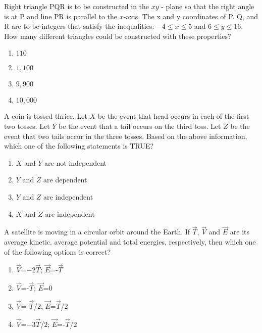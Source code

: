 \begin{center}
\end{center}


    \item Right triangle PQR is to be constructed in the $xy$ - plane so that the right angle is at P and line PR is parallel to the $x$-axis. The x and y coordinates of P. Q, and R are to be integers that satisfy the inequalities: $-4\leq x\leq 5$ and $6\leq y\leq 16$. How many different triangles could be constructed with these properties?
    \begin{enumerate}
    \item $110$
    \item $1,100$
    \item $9,900$
    \item $10,000$
    \end{enumerate}

    \item A coin is tossed thrice. Let $X$ be the event that head occurs in each of the first two tosses. Let $Y$ be the event that a tail occurs on the third toss. Let $Z$ be the event that two tails occur in the three tosses. Based on the above information, which one of the following statements is TRUE?
    \begin{enumerate}
    \item $X$ and $Y$ are not independent 
    \item $Y$ and $Z$ are dependent
    \item $Y$ and $Z$ are independent
    \item $X$ and $Z$ are independent
    \end{enumerate}

    \item A satellite is moving in a circular orbit around the Earth. If $\vec{T}$, $\vec{V}$ and $\vec{E}$ are its average kinetic. average potential and total energies, respectively, then which one of the following options is correct?
    \begin{enumerate}
    \item $\vec{V}$=$-2\vec{T}$; $\vec{E}$=-$\vec{T}$
    \item $\vec{V}$=-$\vec{T}$; $\vec{E}$=$0$
    \item $\vec{V}$=-$\vec{T}$/$2$; $\vec{E}$=$\vec{T}$/$2$
    \item $\vec{V}$=$-3\vec{T}$/$2$; $\vec{E}$=-$\vec{T}$/$2$ 
    \end{enumerate}

